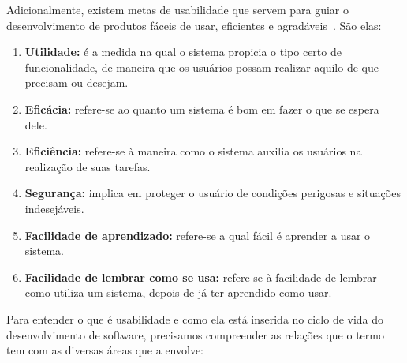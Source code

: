 
Adicionalmente, existem metas de usabilidade que servem para guiar o desenvolvimento de produtos fáceis de usar, eficientes e agradáveis~\cite{preece2007}. São elas:

\begin{enumerate}
	\item \textbf{Utilidade:} é a medida na qual o sistema propicia o tipo certo de funcionalidade, de maneira que os usuários possam realizar aquilo de que precisam ou desejam.
	\item \textbf{Eficácia:} refere-se ao quanto um sistema é bom em fazer o que se espera dele.
	\item \textbf{Eficiência:} refere-se à maneira como o sistema auxilia os usuários na realização de suas tarefas.
	\item \textbf{Segurança:} implica em proteger o usuário de condições perigosas e situações indesejáveis.
	\item \textbf{Facilidade de aprendizado:} refere-se a qual fácil é aprender a usar o sistema.
	\item \textbf{Facilidade de lembrar como se usa:} refere-se à facilidade de lembrar como utiliza um sistema, depois de já ter aprendido como usar.
\end{enumerate}

Para entender o que é usabilidade e como ela está inserida no ciclo de vida do desenvolvimento de software, precisamos compreender as relações que o termo tem com as diversas áreas que a envolve: 

